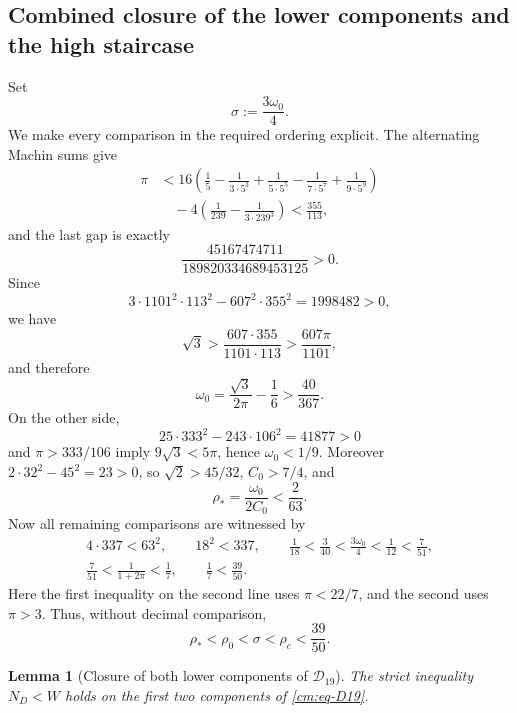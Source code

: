 \documentclass[11pt]{article}
\numberwithin{equation}{section}
\newtheorem{lemma}[theorem]{Lemma}
\theoremstyle{definition}
\theoremstyle{remark}
\begin{document}
\subsection{Combined closure of the lower components and the high staircase}

Set
\[
 \sigma:=\frac{3\omega_0}{4}.
\]
We make every comparison in the required ordering explicit.  The
alternating Machin sums give
\[
\begin{aligned}
 \pi
 &<16\left(\frac15-\frac1{3\cdot5^3}
 +\frac1{5\cdot5^5}-\frac1{7\cdot5^7}
 +\frac1{9\cdot5^9}\right)\\
 &\quad-4\left(\frac1{239}-\frac1{3\cdot239^3}\right)
 <\frac{355}{113},
\end{aligned}
\]
and the last gap is exactly
\[
 \frac{45167474711}{189820334689453125}>0.
\]
Since
\[
 3\cdot1101^2\cdot113^2-607^2\cdot355^2=1998482>0,
\]
we have
\[
 \sqrt3>\frac{607\cdot355}{1101\cdot113}
 >\frac{607\pi}{1101},
\]
and therefore
\begin{equation}
 \omega_0=\frac{\sqrt3}{2\pi}-\frac16>\frac{40}{367}.
 \label{cm:eq-omega-lower}
\end{equation}
On the other side,
\[
 25\cdot333^2-243\cdot106^2=41877>0
\]
and \(\pi>333/106\) imply \(9\sqrt3<5\pi\), hence
\(\omega_0<1/9\).  Moreover
\(2\cdot32^2-45^2=23>0\), so
\(\sqrt2>45/32\), \(C_0>7/4\), and
\[
 \rho_*=\frac{\omega_0}{2C_0}<\frac2{63}.
\]
Now all remaining comparisons are witnessed by
\[
\begin{gathered}
 4\cdot337<63^2,\qquad 18^2<337,\qquad
 \frac1{18}<\frac3{40}<\frac{3\omega_0}{4}
 <\frac1{12}<\frac7{51},\\
 \frac7{51}<\frac1{1+2\pi}<\frac17,\qquad
 \frac17<\frac{39}{50}.
\end{gathered}
\]
Here the first inequality on the second line uses \(\pi<22/7\), and the
second uses \(\pi>3\).  Thus, without decimal comparison,
\[
 \rho_*<\rho_0<\sigma<\rho_c<\frac{39}{50}.
\]

\begin{lemma}[Closure of both lower components of \(\mathcal D_{19}\)]
\label{cm:lem-lower-closure}
The strict inequality \(N_D<W\) holds on the first two components of
\eqref{cm:eq-D19}.
\end{lemma}
\end{document}
